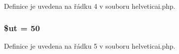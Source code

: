Definice je uvedena na řádku 4 v souboru helveticai.\-php.

\hypertarget{helveticai_8php_aadd3f841051043ee58e587e840e8dd0b}{
\subsubsection[{\$ut}]{\setlength{\rightskip}{0pt plus 5cm}\$ut = 50}}\label{helveticai_8php_aadd3f841051043ee58e587e840e8dd0b}


Definice je uvedena na řádku 5 v souboru helveticai.\-php.

